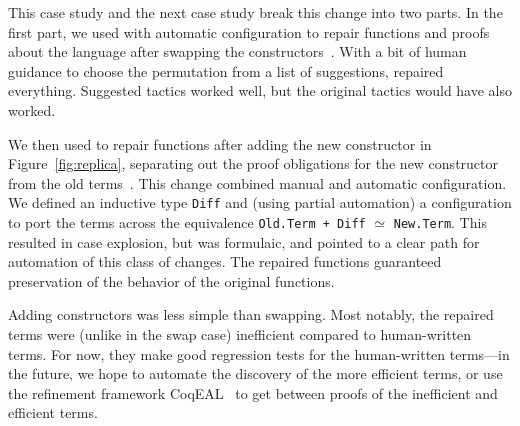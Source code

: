 This case study and the next case study break this change into two parts.
In the first part, we used \toolname with automatic configuration to repair functions and proofs about the language
after swapping the constructors~.
With a bit of human guidance to choose the permutation from a list of suggestions,
\toolname repaired everything.
Suggested tactics worked well, but the 
original tactics would have also worked.

We then used \toolname to repair functions 
after adding the new constructor in Figure~\ref{fig:replica}, separating out the proof obligations for the new constructor from the old terms~.
This change combined manual and automatic configuration.
We defined an inductive type \lstinline{Diff} and (using partial automation) a configuration to port the terms across the equivalence \lstinline{Old.Term + Diff} $\simeq$ \lstinline{New.Term}.
This resulted in case explosion, but was formulaic, and pointed to a clear path for automation of this class of changes.
The repaired functions guaranteed preservation of the behavior of the original functions. %

Adding constructors was less simple than swapping.
Most notably, the repaired terms were (unlike in the swap case) inefficient compared to human-written terms.
For now, they make good regression tests for the human-written terms---in the future,
we hope to automate the discovery of the more efficient terms,
or use the refinement framework CoqEAL~\cite{cohen:hal-01113453}
to get between proofs of the inefficient and efficient terms.

